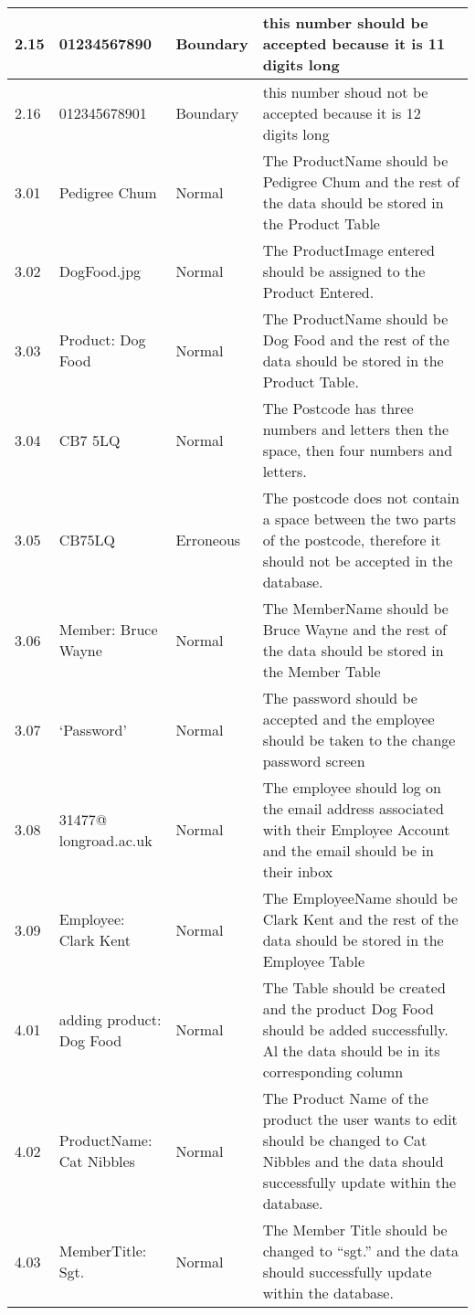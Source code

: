 \begin{flushleft}
\begin{longtable}{|p{1.5cm}|p{2.5cm}|p{2cm}|p{4.5cm}|}
	2.15 &  01234567890 & Boundary & this number should be accepted because it is 11 digits long \\ \hline
	2.16 & 012345678901 & Boundary & this number shoud not be accepted because it is 12 digits long \\ \hline
	3.01 &  Pedigree Chum & Normal & The ProductName should be Pedigree Chum and the rest of the data should be stored in the Product Table \\ \hline
	3.02 &  DogFood.jpg & Normal  & The ProductImage entered should be assigned to the Product Entered. \\ \hline
	3.03 &  Product: Dog Food & Normal & The ProductName should be Dog Food and the rest of the data should be stored in the Product Table. \\ \hline
	3.04 &  CB7 5LQ & Normal & The Postcode has three numbers and letters then the space, then four numbers and letters. \\ \hline
	3.05 &  CB75LQ & Erroneous & The postcode does not contain a space between the two parts of the postcode, therefore it should not be accepted in the database.\\ \hline
	3.06 &  Member: Bruce Wayne & Normal & The MemberName should be Bruce Wayne  and the rest of the data should be stored in the Member Table \\ \hline
	3.07 &  `Password' & Normal & The password should be accepted and the employee should be taken to the change password screen \\ \hline
	3.08 &  31477@ longroad.ac.uk & Normal & The employee should log on the email address associated with their Employee Account and the email should be in their inbox \\ \hline
	3.09 & Employee: Clark Kent & Normal & The EmployeeName should be Clark Kent and the rest of the data should be stored in the Employee Table \\ \hline
	4.01 & adding product: Dog Food & Normal & The Table should be created and the product Dog Food should be added successfully. Al the data should be in its corresponding column \\ \hline
	4.02 & ProductName: Cat Nibbles & Normal &The Product Name of the product the user wants to edit should be changed to Cat Nibbles and the data should successfully update within the database. \\ \hline
	4.03 & MemberTitle: Sgt. & Normal &  The Member Title should be changed to ``sgt.'' and the data should successfully update within the database. \\ \hline

\end{longtable}
\end{flushleft}
